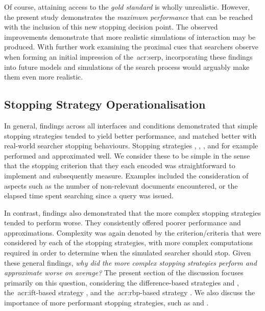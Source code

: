 Of course, attaining access to the \emph{gold standard} is wholly unrealistic. However, the present study demonstrates the \emph{maximum performance} that can be reached with the inclusion of this new stopping decision point. The observed improvements demonstrate that more realistic simulations of interaction may be produced. With further work examining the proximal cues that searchers observe when forming an initial impression of the~\gls{acr:serp}, incorporating these findings into future models and simulations of the search process would arguably make them even more realistic.

\subsection{Stopping Strategy Operationalisation}\label{sec:conclusions:discussion:strategies}
In general, findings across all interfaces and conditions demonstrated that simple stopping strategies tended to yield better performance, and matched better with real-world searcher stopping behaviours. Stopping strategies , , ,  and  for example performed and approximated well. We consider these to be simple in the sense that the stopping criterion that they each encoded was straightforward to implement and subsequently measure. Examples included the consideration of aspects such as the number of non-relevant documents encountered, or the elapsed time spent searching since a query was issued.

In contrast, findings also demonstrated that the more complex stopping strategies tended to perform worse. They consistently offered poorer performance and approximations. Complexity was again denoted by the criterion/criteria that were considered by each of the stopping strategies, with more complex computations required in order to determine when the simulated searcher should stop. Given these general findings, \emph{why did the more complex stopping strategies perform and approximate worse on average?} The present section of the discussion focuses primarily on this question, considering the difference-based strategies  and , the~\gls{acr:ift}-based strategy , and the~\gls{acr:rbp}-based strategy . We also discuss the importance of more performant stopping strategies, such as  and .

